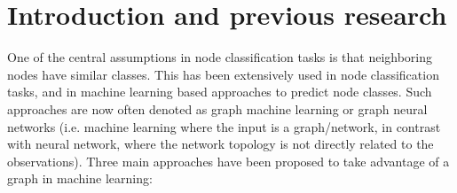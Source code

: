 \section{Introduction and previous research}

One of the central assumptions in node classification tasks is that neighboring nodes have similar classes. This has been extensively used in node classification tasks, and in machine learning based approaches to predict node classes. Such approaches are now often denoted as graph machine learning or graph neural networks (i.e. machine learning where the input is a graph/network, in contrast with neural network, where the network topology is not directly related to the observations). Three main approaches have been proposed to take advantage of a graph in machine learning:

